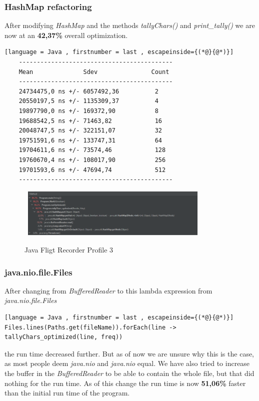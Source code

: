 \subsubsection{HashMap refactoring}
\label{sec:2.6.2}
After modifying \emph{HashMap} and the methods \emph{tallyChars()} and \emph{print\_tally()} we are now at an \textbf{42,37\%} overall optimization.
\begin{lstlisting}[language = Java , firstnumber = last , escapeinside={(*@}{@*)}]
    -------------------------------------------
    Mean              Sdev               Count
    -------------------------------------------
    24734475,0 ns +/- 6057492,36          2
    20550197,5 ns +/- 1135309,37          4
    19897790,0 ns +/- 169372,90           8
    19688542,5 ns +/- 71463,82            16
    20048747,5 ns +/- 322151,07           32
    19751591,6 ns +/- 133747,31           64
    19704611,6 ns +/- 73574,46            128
    19760670,4 ns +/- 108017,90           256
    19701593,6 ns +/- 47694,74            512
    -------------------------------------------
\end{lstlisting}

\begin{figure}[H]
    \centering\
    \includegraphics[width = 0.8\textwidth ]{figures/profile3.PNG}
    \caption{Java Fligt Recorder Profile 3}
    \label{fig:p3}
\end{figure}

\subsubsection{java.nio.file.Files}
\label{sec:2.6.3}

After changing from \emph{BufferedReader} to this lambda expression from \emph{java.nio.file.Files} \begin{lstlisting}[language = Java , firstnumber = last , escapeinside={(*@}{@*)}]
Files.lines(Paths.get(fileName)).forEach(line -> tallyChars_optimized(line, freq))
\end{lstlisting} the run time decreased further. But as of now we are unsure why this is the case, as most people deem \emph{java.nio} and \emph{java.nio} equal. We have also tried to increase the buffer in the \emph{BufferedReader} to be able to contain the whole file, but that did nothing for the run time. As of this change the run time is now \textbf{51,06\%} faster than the initial run time of the program.

